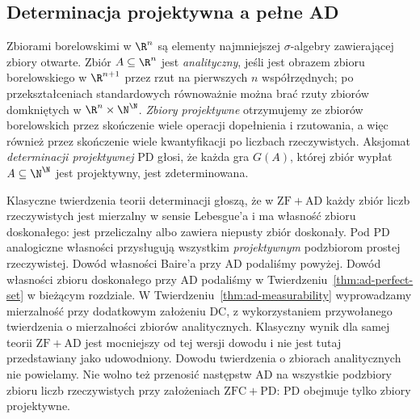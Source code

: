 \subsection{Determinacja projektywna a pełne AD}
\begin{definicja}
\label{def:ad-projective}
Zbiorami borelowskimi w $\R^n$ są elementy najmniejszej
$\sigma$-algebry zawierającej zbiory otwarte.
Zbiór $A\subseteq\R^n$ jest \emph{analityczny}, jeśli
jest obrazem zbioru borelowskiego w $\R^{n+1}$ przez
rzut na pierwszych $n$ współrzędnych; po przekształceniach
standardowych równoważnie można brać rzuty zbiorów
domkniętych w $\R^n\times\N^\N$.
\emph{Zbiory projektywne} otrzymujemy ze zbiorów
borelowskich przez skończenie wiele operacji dopełnienia
i rzutowania, a więc również przez skończenie wiele
kwantyfikacji po liczbach rzeczywistych.
Aksjomat \emph{determinacji projektywnej} $\mathrm{PD}$
głosi, że każda gra $G(A)$, której zbiór wypłat
$A\subseteq\N^\N$ jest projektywny, jest zdeterminowana.
\end{definicja}
\begin{uwaga}
\label{rem:ad-deep-regularity}
Klasyczne twierdzenia teorii determinacji głoszą, że
w $\mathrm{ZF}+\mathrm{AD}$ każdy zbiór liczb rzeczywistych
jest mierzalny w sensie Lebesgue'a i ma własność zbioru
doskonałego: jest przeliczalny albo zawiera niepusty
zbiór doskonały. Pod $\mathrm{PD}$ analogiczne własności
przysługują wszystkim \emph{projektywnym} podzbiorom prostej rzeczywistej.
Dowód własności Baire'a przy AD podaliśmy powyżej.
Dowód własności zbioru doskonałego przy AD
podaliśmy w Twierdzeniu~\ref{thm:ad-perfect-set}
w bieżącym rozdziale.
W Twierdzeniu~\ref{thm:ad-measurability}
wyprowadzamy mierzalność przy dodatkowym założeniu
$\mathrm{DC}$, z wykorzystaniem przywołanego
twierdzenia o mierzalności zbiorów analitycznych.
Klasyczny wynik dla samej teorii $\mathrm{ZF}+\mathrm{AD}$
jest mocniejszy od tej wersji dowodu i nie
jest tutaj przedstawiany jako udowodniony.
Dowodu twierdzenia o zbiorach analitycznych
nie powielamy.
Nie wolno też przenosić następstw AD na wszystkie
podzbiory zbioru liczb rzeczywistych przy założeniach
$\mathrm{ZFC}+\mathrm{PD}$:
PD obejmuje tylko zbiory projektywne.
\end{uwaga}


